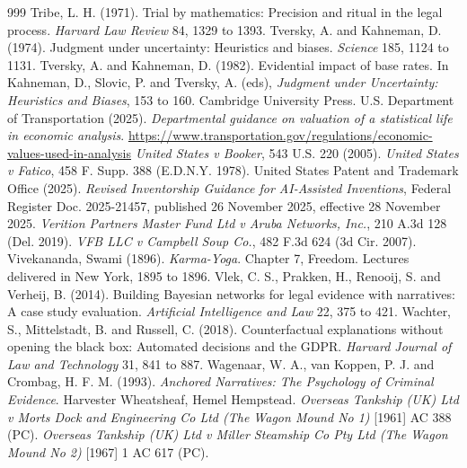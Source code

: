 \begin{thebibliography}{999}
 Tribe, L. H. (1971). Trial by mathematics: Precision and ritual in the legal process. \emph{Harvard Law Review} 84, 1329 to 1393.
 Tversky, A. and Kahneman, D. (1974). Judgment under uncertainty: Heuristics and biases. \emph{Science} 185, 1124 to 1131.
 Tversky, A. and Kahneman, D. (1982). Evidential impact of base rates. In Kahneman, D., Slovic, P. and Tversky, A. (eds), \emph{Judgment under Uncertainty: Heuristics and Biases}, 153 to 160. Cambridge University Press.
 U.S. Department of Transportation (2025). \emph{Departmental guidance on valuation of a statistical life in economic analysis}. \url{https://www.transportation.gov/regulations/economic-values-used-in-analysis}
 \emph{United States v Booker}, 543 U.S. 220 (2005).
 \emph{United States v Fatico}, 458 F. Supp. 388 (E.D.N.Y. 1978).
 United States Patent and Trademark Office (2025). \emph{Revised Inventorship Guidance for AI-Assisted Inventions}, Federal Register Doc. 2025-21457, published 26 November 2025, effective 28 November 2025.
 \emph{Verition Partners Master Fund Ltd v Aruba Networks, Inc.}, 210 A.3d 128 (Del. 2019).
 \emph{VFB LLC v Campbell Soup Co.}, 482 F.3d 624 (3d Cir. 2007).
 Vivekananda, Swami (1896). \emph{Karma-Yoga}. Chapter 7, Freedom. Lectures delivered in New York, 1895 to 1896.
 Vlek, C. S., Prakken, H., Renooij, S. and Verheij, B. (2014). Building Bayesian networks for legal evidence with narratives: A case study evaluation. \emph{Artificial Intelligence and Law} 22, 375 to 421.
 Wachter, S., Mittelstadt, B. and Russell, C. (2018). Counterfactual explanations without opening the black box: Automated decisions and the GDPR. \emph{Harvard Journal of Law and Technology} 31, 841 to 887.
 Wagenaar, W. A., van Koppen, P. J. and Crombag, H. F. M. (1993). \emph{Anchored Narratives: The Psychology of Criminal Evidence}. Harvester Wheatsheaf, Hemel Hempstead.
 \emph{Overseas Tankship (UK) Ltd v Morts Dock and Engineering Co Ltd (The Wagon Mound No 1)} [1961] AC 388 (PC).
 \emph{Overseas Tankship (UK) Ltd v Miller Steamship Co Pty Ltd (The Wagon Mound No 2)} [1967] 1 AC 617 (PC).

\end{thebibliography}
